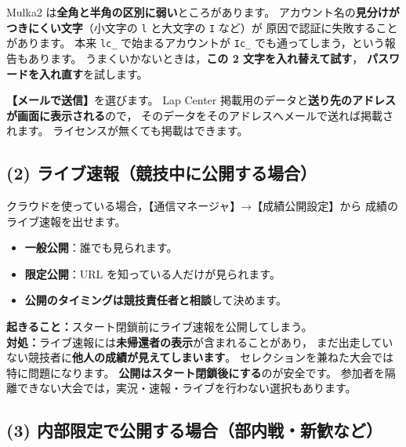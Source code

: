 \begin{Note}[アップロードできないとき]
Mulka2 は\textbf{全角と半角の区別に弱い}ところがあります。
アカウント名の\textbf{見分けがつきにくい文字}（小文字の \texttt{l} と大文字の \texttt{I} など）が
原因で認証に失敗することがあります。
本来 \texttt{lc\_} で始まるアカウントが \texttt{Ic\_} でも通ってしまう，という報告もあります。
うまくいかないときは，\textbf{この 2 文字を入れ替えて試す}，
\textbf{パスワードを入れ直す}を試します。
\end{Note}

\begin{Note}[ライセンスが無い場合]
\textbf{【メールで送信】}を選びます。
Lap Center 掲載用のデータと\textbf{送り先のアドレスが画面に表示される}ので，
そのデータをそのアドレスへメールで送れば掲載されます。
ライセンスが無くても掲載はできます。
\end{Note}

\subsection*{(2) ライブ速報（競技中に公開する場合）}

クラウドを使っている場合，【通信マネージャ】→【成績公開設定】から
成績のライブ速報を出せます。\ver

\begin{itemize}
\item \textbf{一般公開}：誰でも見られます。
\item \textbf{限定公開}：URL を知っている人だけが見られます。
\item \textbf{公開のタイミングは競技責任者と相談}して決めます。
\end{itemize}

\begin{Fail}
\textbf{起きること：}スタート閉鎖前にライブ速報を公開してしまう。\\
\textbf{対処：}ライブ速報には\textbf{未帰還者の表示}が含まれることがあり，
まだ出走していない競技者に\textbf{他人の成績が見えてしまいます}。
セレクションを兼ねた大会では特に問題になります。
\textbf{公開はスタート閉鎖後にする}のが安全です。
参加者を隔離できない大会では，実況・速報・ライブを行わない選択もあります。
\end{Fail}

\subsection*{(3) 内部限定で公開する場合（部内戦・新歓など）}

